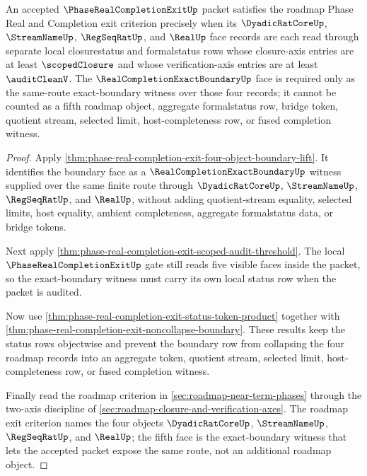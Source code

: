\begin{theorem}
\label{thm:phase-real-completion-exit-four-object-threshold-projection}
An accepted $\PhaseRealCompletionExitUp$ packet satisfies the roadmap Phase Real and Completion exit criterion precisely when its $\DyadicRatCoreUp$, $\StreamNameUp$, $\RegSeqRatUp$, and $\RealUp$ face records are each read through separate local closurestatus and formalstatus rows whose closure-axis entries are at least $\scopedClosure$ and whose verification-axis entries are at least $\auditCleanV$. The $\RealCompletionExactBoundaryUp$ face is required only as the same-route exact-boundary witness over those four records; it cannot be counted as a fifth roadmap object, aggregate formalstatus row, bridge token, quotient stream, selected limit, host-completeness row, or fused completion witness.
\end{theorem}
\begin{proof}
Apply \autoref{thm:phase-real-completion-exit-four-object-boundary-lift}. It identifies the boundary face as a $\RealCompletionExactBoundaryUp$ witness supplied over the same finite route through $\DyadicRatCoreUp$, $\StreamNameUp$, $\RegSeqRatUp$, and $\RealUp$, without adding quotient-stream equality, selected limits, host equality, ambient completeness, aggregate formalstatus data, or bridge tokens.

Next apply \autoref{thm:phase-real-completion-exit-scoped-audit-threshold}. The local $\PhaseRealCompletionExitUp$ gate still reads five visible faces inside the packet, so the exact-boundary witness must carry its own local status row when the packet is audited.

Now use \autoref{thm:phase-real-completion-exit-status-token-product} together with \autoref{thm:phase-real-completion-exit-noncollapse-boundary}. These results keep the status rows objectwise and prevent the boundary row from collapsing the four roadmap records into an aggregate token, quotient stream, selected limit, host-completeness row, or fused completion witness.

Finally read the roadmap criterion in \autoref{sec:roadmap-near-term-phases} through the two-axis discipline of \autoref{sec:roadmap-closure-and-verification-axes}. The roadmap exit criterion names the four objects $\DyadicRatCoreUp$, $\StreamNameUp$, $\RegSeqRatUp$, and $\RealUp$; the fifth face is the exact-boundary witness that lets the accepted packet expose the same route, not an additional roadmap object.
\end{proof}

